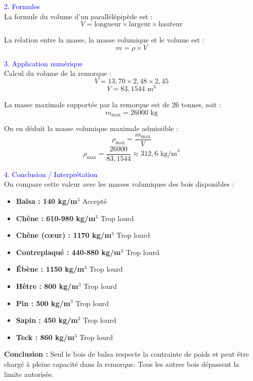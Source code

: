 \documentclass[a4paper,12pt]{article}
\begin{document}
\vspace{0.5cm}

\textcolor{blue}{2. Formules} \\

La formule du volume d'un parallélépipède est :
\[
V = \text{longueur} \times \text{largeur} \times \text{hauteur}
\]

La relation entre la masse, la masse volumique et le volume est :
\[
m = \rho \times V
\]

\vspace{0.5cm}

\textcolor{blue}{3. Application numérique} \\

Calcul du volume de la remorque :
\[
V = 13,70 \times 2,48 \times 2,45
\]
\[
V = 83,1544 \text{ m}^3
\]

La masse maximale supportée par la remorque est de 26 tonnes, soit :
\[
m_{\max} = 26000 \text{ kg}
\]

On en déduit la masse volumique maximale admissible :
\[
\rho_{\max} = \frac{m_{\max}}{V}
\]
\[
\rho_{\max} = \frac{26000}{83,1544} \approx 312,6 \text{ kg/m}^3
\]

\vspace{0.5cm}

\textcolor{blue}{4. Conclusion / Interprétation} \\

On compare cette valeur avec les masses volumiques des bois disponibles :

\begin{itemize}
    \item \textbf{Balsa : 140 kg/m$^3$} \quad Accepté
    \item \textbf{Chêne : 610-980 kg/m$^3$} \quad Trop lourd
    \item \textbf{Chêne (cœur) : 1170 kg/m$^3$} \quad Trop lourd
    \item \textbf{Contreplaqué : 440-880 kg/m$^3$} \quad Trop lourd
    \item \textbf{Ébène : 1150 kg/m$^3$} \quad Trop lourd
    \item \textbf{Hêtre : 800 kg/m$^3$} \quad Trop lourd
    \item \textbf{Pin : 500 kg/m$^3$} \quad Trop lourd
    \item \textbf{Sapin : 450 kg/m$^3$} \quad Trop lourd
    \item \textbf{Teck : 860 kg/m$^3$} \quad Trop lourd
\end{itemize}

\textbf{Conclusion :} Seul le bois de balsa respecte la contrainte de poids et peut être chargé à pleine capacité dans la remorque. Tous les autres bois dépassent la limite autorisée.
\end{document}

